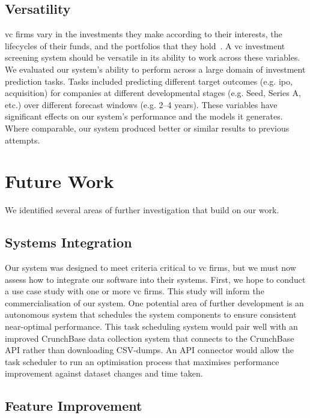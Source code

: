 \documentclass[../thesis/thesis.tex]{subfiles}
\begin{document}
\subsection{Versatility}

\Gls{vc} firms vary in the investments they make according to their interests, the lifecycles of their funds, and the portfolios that they hold~\cite{gompers1995}. A \gls{vc} investment screening system should be versatile in its ability to work across these variables. We evaluated our system's ability to perform across a large domain of investment prediction tasks. Tasks included predicting different target outcomes (e.g. \gls{ipo}, acquisition) for companies at different developmental stages (e.g. Seed, Series A, etc.) over different forecast windows (e.g. 2--4 years). These variables have significant effects on our system's performance and the models it generates. Where comparable, our system produced better or similar results to previous attempts.

\section{Future Work}

We identified several areas of further investigation that build on our work.

\subsection{Systems Integration}

Our system was designed to meet criteria critical to \gls{vc} firms, but we must now assess how to integrate our software into their systems. First, we hope to conduct a use case study with one or more \gls{vc} firms. This study will inform the commercialisation of our system. One potential area of further development is an autonomous system that schedules the system components to ensure consistent near-optimal performance. This task scheduling system would pair well with an improved CrunchBase data collection system that connects to the CrunchBase API rather than downloading CSV-dumps. An API connector would allow the task scheduler to run an optimisation process that maximises performance improvement against dataset changes and time taken.

\subsection{Feature Improvement}
\end{document}
